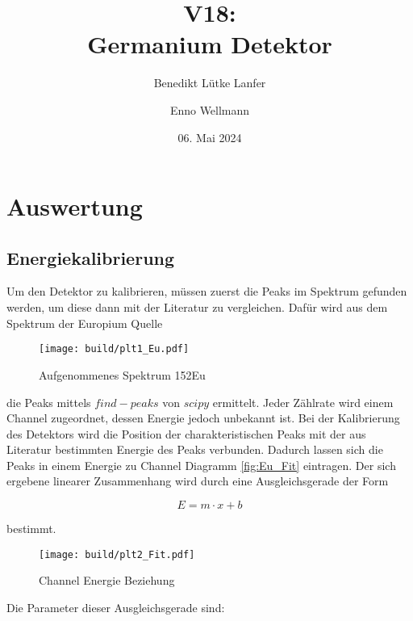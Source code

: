 

\title{V18:\\ Germanium Detektor}
\author{Benedikt Lütke Lanfer \and Enno Wellmann}
\date{06. Mai 2024}
\publishers{TU Dortmund – Fakultät Physik}



\tableofcontents
\newpage



\newpage
\section{Auswertung}
\subsection{Energiekalibrierung}
Um den Detektor zu kalibrieren, müssen zuerst die Peaks im Spektrum gefunden
werden, um diese dann mit der Literatur zu vergleichen. Dafür wird aus dem
Spektrum der Europium Quelle

\begin{figure}[H]
	\centering
	\texttt{[image: build/plt1\_Eu.pdf]}
	\caption{Aufgenommenes Spektrum 152Eu}\label{fig:Eu_spektrum}
\end{figure}

die Peaks mittels $find-peaks$ von $scipy$ \cite{scipy} ermittelt. Jeder
Zählrate wird einem Channel zugeordnet, dessen Energie jedoch unbekannt ist.
Bei der Kalibrierung des Detektors wird die Position der charakteristischen
Peaks mit der aus Literatur \cite{web:Eu} bestimmten Energie des Peaks
verbunden. Dadurch lassen sich die Peaks in einem Energie zu Channel Diagramm
\eqref{fig:Eu_Fit} eintragen. Der sich ergebene linearer Zusammenhang wird
durch eine Ausgleichsgerade der Form

\begin{equation}
	E=m \cdot x +b
\end{equation}

bestimmt.

\begin{figure}[H]
	\centering
	\texttt{[image: build/plt2\_Fit.pdf]}
	\caption{Channel Energie Beziehung}\label{fig:Eu_Fit}
\end{figure}

Die Parameter dieser Ausgleichsgerade sind:

